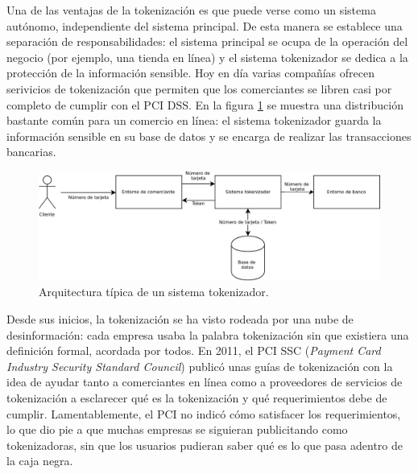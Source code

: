 Una de las ventajas de la tokenización es que puede verse como un sistema
autónomo, independiente del sistema principal. De esta manera se establece una
separación de responsabilidades: el sistema principal se ocupa de la operación
del negocio (por ejemplo, una tienda en línea) y el sistema tokenizador se
dedica a la protección de la información sensible. Hoy en día varias compañías
ofrecen serivicios de tokenización que permiten que los comerciantes se libren
casi por completo de cumplir con el PCI DSS. En la figura
\ref{figura:arquitectura_tokenizacion} se muestra una distribución bastante
común para un comercio en línea: el sistema tokenizador guarda la información
sensible en su base de datos y se encarga de realizar las transacciones
bancarias.

\begin{figure}
  \centering
  \includegraphics[width=0.8\linewidth]
    {algoritmos_tokenizadores/diagramas/sistema_tokenizador.png}
  \caption{Arquitectura típica de un sistema tokenizador.}
  \label{figura:arquitectura_tokenizacion}
\end{figure}


Desde sus inicios, la tokenización se ha visto rodeada por una nube de
desinformación: cada empresa usaba la palabra tokenización sin que existiera una
definición formal, acordada por todos. En 2011, el PCI SSC (\textit{Payment Card
Industry Security Standard Council}) publicó unas guías de tokenización
\cite{pci_tokens} con la idea de ayudar tanto a comerciantes en línea como a
proveedores de servicios de tokenización a esclarecer qué es la tokenización y
qué requerimientos debe de cumplir. Lamentablemente, el PCI no indicó cómo
satisfacer los requerimientos, lo que dio pie a que muchas empresas se siguieran
publicitando como tokenizadoras, sin que los usuarios pudieran saber qué es lo
que pasa adentro de la caja negra.

